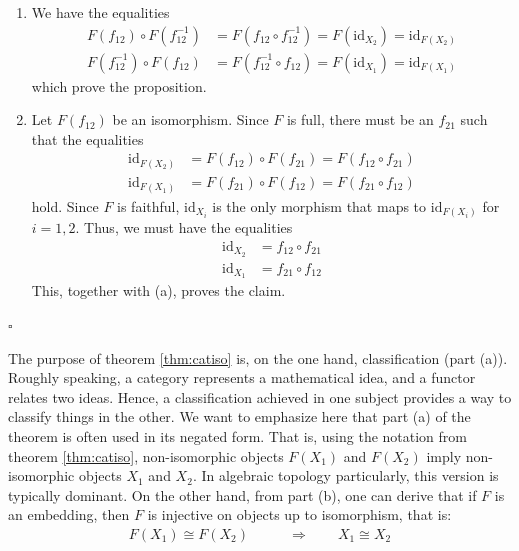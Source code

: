 \begin{prf}
\begin{enumerate}
\item[(a)]
We have the equalities
\begin{align*}
  F(f_{12})
  \circ
  F(f_{12}^{-1})
  &=
  F(f_{12} \circ f_{12}^{-1})
  =
  F(\mathrm{id}_{X_{2}})
  =
  \mathrm{id}_{F(X_{2})}
  \\
  F(f_{12}^{-1})
  \circ
  F(f_{12})
  &=
  F(f_{12}^{-1} \circ f_{12})
  =
  F(\mathrm{id}_{X_{1}})
  =
  \mathrm{id}_{F(X_{1})}
\end{align*}
which prove the proposition.
\item[(b)]
Let $F(f_{12})$ be an isomorphism.
Since $F$ is full, there must be an $f_{21}$ such that the equalities
\begin{align*}
  \mathrm{id}_{F(X_{2})}
  &=
  F(f_{12})
  \circ
  F(f_{21})
  =
  F(f_{12} \circ f_{21})
  \\
  \mathrm{id}_{F(X_{1})}
  &=
  F(f_{21})
  \circ
  F(f_{12})
  =
  F(f_{21} \circ f_{12})
\end{align*}
hold.
Since $F$ is faithful, $\mathrm{id}_{X_{i}}$ is the only morphism that maps to $\mathrm{id}_{F(X_{i})}$ for $i = 1,2$.
Thus, we must have the equalities
\begin{align*}
  \mathrm{id}_{X_{2}}
  &=
  f_{12}
  \circ
  f_{21}
  \\
  \mathrm{id}_{X_{1}}
  &=
  f_{21}
  \circ
  f_{12}
\end{align*}
This, together with (a), proves the claim.
\end{enumerate}
\phantom{proven}
\hfill
$\square$
\end{prf}
The purpose of theorem \ref{thm:catiso} is, on the one hand, classification (part (a)).
Roughly speaking, a category represents a mathematical idea, and a functor relates two ideas.
Hence, a classification achieved in one subject provides a way to classify things in the other.
We want to emphasize here that part (a) of the theorem is often used in its negated form.
That is, using the notation from theorem \ref{thm:catiso}, non-isomorphic objects $F(X_{1})$ and $F(X_{2})$ imply non-isomorphic objects $X_{1}$ and $X_{2}$.
In algebraic topology particularly, this version is typically dominant.
On the other hand, from part (b), one can derive that if $F$ is an embedding, then $F$ is injective on objects up to isomorphism, that is:
\begin{align*}
  F(X_{1})
  \cong
  F(X_{2})
  \qquad
  &\Rightarrow
  \qquad
  X_{1}
  \cong
  X_{2}
\end{align*}
